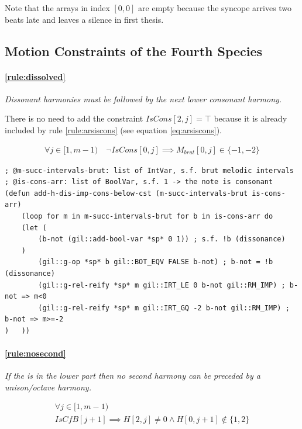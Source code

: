 Note that the arrays in index $[0, 0]$ are empty because the syncope arrives two beats late and leaves a silence in first thesis.

\subsection{Motion Constraints of the Fourth Species}
\paragraph{\ref{rule:dissolved}} \textit{Dissonant harmonies must be followed by the next lower consonant harmony.}

There is no need to add the constraint $IsCons[2, j] = \top$ because it is already included by rule \ref{rule:arsiscons} (see equation \ref{eq:arsiscons}).

\begin{equation}
    \begin{gathered}
        \forall j \in [1, m-1) \quad
        \lnot IsCons[0, j] \implies M_{brut}[0, j] \in \{-1, -2\}
    \end{gathered}
\end{equation}

\begin{lstlisting}[caption=Function that constrains a dissonance to be followed by a consonance., label=lst:dissonance]
; @m-succ-intervals-brut: list of IntVar, s.f. brut melodic intervals
; @is-cons-arr: list of BoolVar, s.f. 1 -> the note is consonant
(defun add-h-dis-imp-cons-below-cst (m-succ-intervals-brut is-cons-arr)
    (loop for m in m-succ-intervals-brut for b in is-cons-arr do
    (let (
        (b-not (gil::add-bool-var *sp* 0 1)) ; s.f. !b (dissonance)
    )
        (gil::g-op *sp* b gil::BOT_EQV FALSE b-not) ; b-not = !b (dissonance)
        (gil::g-rel-reify *sp* m gil::IRT_LE 0 b-not gil::RM_IMP) ; b-not => m<0
        (gil::g-rel-reify *sp* m gil::IRT_GQ -2 b-not gil::RM_IMP) ; b-not => m>=-2
)   ))
\end{lstlisting}

\paragraph{\ref{rule:nosecond}} \textit{If the \cf is in the lower part then no second harmony can be preceded by a unison/octave harmony.}

\begin{equation}
    \begin{gathered}
        \forall j \in [1, m-1)\\
        IsCfB[j+1] \implies H[2, j] \neq 0 \land H[0, j+1] \notin \{1, 2\}
    \end{gathered}
\end{equation}

